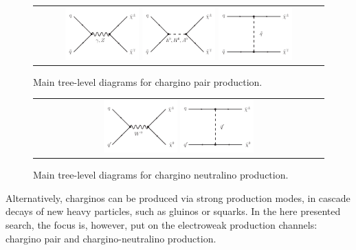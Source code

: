 \begin{figure}[!h]
  \centering 
  \begin{tabular}{c}
    \includegraphics[width=0.26\textwidth]{figures/analysis/ChiChi_GammaZ.pdf}
    \includegraphics[width=0.26\textwidth]{figures/analysis/ChiChi_Scalar.pdf}
    \includegraphics[width=0.26\textwidth]{figures/analysis/ChiChi_Squark.pdf}
  \end{tabular}
  \caption{Main tree-level diagrams for chargino pair production.}
  \label{fig:FeynmanDiagramProductionCharginoPair}
\end{figure}

\begin{figure}[!h]
  \centering 
  \begin{tabular}{c}
    \includegraphics[width=0.26\textwidth]{figures/analysis/ChiChi0_WBoson.pdf}
    \includegraphics[width=0.26\textwidth]{figures/analysis/ChiChi0_Squark.pdf}
  \end{tabular}
  \caption{Main tree-level diagrams for chargino neutralino production.}
  \label{fig:FeynmanDiagramProductionCharginoNeutralino}
\end{figure}
Alternatively, charginos can be produced via strong production modes, \ie in cascade decays of new heavy particles, such as gluinos or squarks.
In the here presented search, the focus is, however, put on the electroweak production channels: chargino pair and chargino-neutralino production.\\



